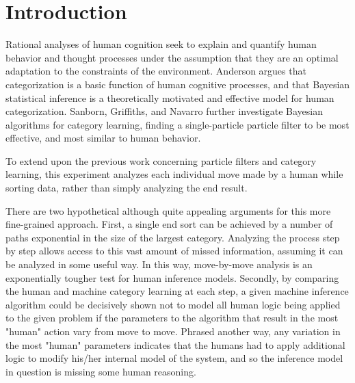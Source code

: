 \section*{Introduction}

Rational analyses of human cognition seek to explain and quantify human behavior
and thought processes under the assumption that they are an optimal adaptation
to the constraints of the environment. Anderson \cite{anderson1991} argues that
categorization is a basic function of human cognitive processes, and that
Bayesian statistical inference is a theoretically motivated and effective model
for human categorization. Sanborn, Griffiths, and Navarro \cite{sanborn2010}
further investigate Bayesian algorithms for category learning, finding a
single-particle particle filter to be most effective, and most similar to human behavior.

To extend upon the previous work concerning particle filters and category
learning, this experiment analyzes each individual move made by a human while
sorting data, rather than simply analyzing the end result.

There are two hypothetical although quite appealing arguments for this more
fine-grained approach. First, a single end sort can be achieved by a number of
paths exponential in the size of the largest category. Analyzing the process
step by step allows access to this vast amount of missed information, assuming
it can be analyzed in some useful way. In this way, move-by-move analysis is an
exponentially tougher test for human inference models. Secondly, by comparing
the human and machine category learning at each step, a given machine inference
algorithm could be decisively shown not to model all human logic being applied
to the given problem if the parameters to the algorithm that result in the most
"human" action vary from move to move. Phrased another way, any variation in the
most "human" parameters indicates that the humans had to apply additional logic
to modify his/her internal model of the system, and so the inference model in
question is missing some human reasoning.
